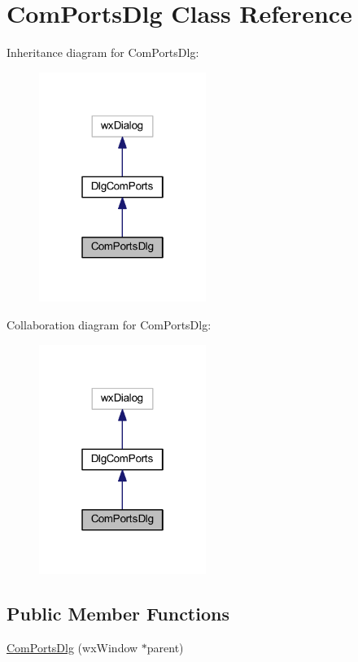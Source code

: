 \hypertarget{class_com_ports_dlg}{\section{Com\-Ports\-Dlg Class Reference}
\label{class_com_ports_dlg}
}


Inheritance diagram for Com\-Ports\-Dlg\-:
\nopagebreak
\begin{figure}[H]
\begin{center}
\leavevmode
\includegraphics[width=154pt]{class_com_ports_dlg__inherit__graph}
\end{center}
\end{figure}


Collaboration diagram for Com\-Ports\-Dlg\-:
\nopagebreak
\begin{figure}[H]
\begin{center}
\leavevmode
\includegraphics[width=154pt]{class_com_ports_dlg__coll__graph}
\end{center}
\end{figure}
\subsection*{Public Member Functions}
\begin{DoxyCompactItemize}
\item 
\hyperlink{class_com_ports_dlg_a02f8415185ed657f0263ae795e2b4f04}{Com\-Ports\-Dlg} (wx\-Window $\ast$parent)
\end{DoxyCompactItemize}
